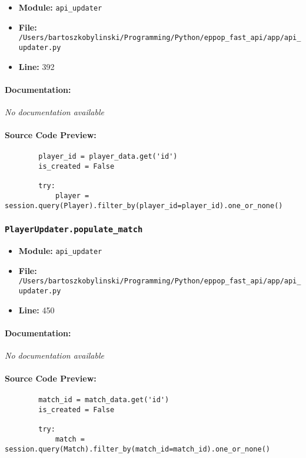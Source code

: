 \documentclass[11pt,a4paper]{article}
\begin{document}
\begin{itemize}
    \item \textbf{Module:} \texttt{api\_updater}
    \item \textbf{File:} \texttt{/Users/bartoszkobylinski/Programming/Python/eppop\_fast\_api/app/api\_updater.py}
    \item \textbf{Line:} 392
\end{itemize}

\paragraph{Documentation:} \textit{No documentation available}

\paragraph{Source Code Preview:}
\begin{verbatim}
        player_id = player_data.get('id')
        is_created = False

        try:
            player = session.query(Player).filter_by(player_id=player_id).one_or_none()
\end{verbatim}

\vspace{1em}
\subsubsection{\texttt{PlayerUpdater.populate\_match}}

\begin{itemize}
    \item \textbf{Module:} \texttt{api\_updater}
    \item \textbf{File:} \texttt{/Users/bartoszkobylinski/Programming/Python/eppop\_fast\_api/app/api\_updater.py}
    \item \textbf{Line:} 450
\end{itemize}

\paragraph{Documentation:} \textit{No documentation available}

\paragraph{Source Code Preview:}
\begin{verbatim}
        match_id = match_data.get('id')
        is_created = False

        try:
            match = session.query(Match).filter_by(match_id=match_id).one_or_none()
\end{verbatim}
\end{document}
